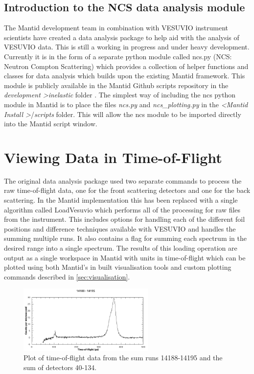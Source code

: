 \documentclass[paper=a4, fontsize=11pt]{scrartcl}	%
\numberwithin{equation}{section}															%
\numberwithin{figure}{section}																%
\numberwithin{table}{section}
\begin{document}
\subsection{Introduction to the NCS data analysis module}
\label{subsec:intro-data-analysis}
The Mantid development team in combination with VESUVIO instrument scientists have created a data analysis package to help aid with the analysis of VESUVIO data. This is still a working in progress and under heavy development. Currently it is in the form of a separate python module called ncs.py (NCS: Neutron Compton Scattering) which provides a collection of helper functions and classes for data analysis which builds upon the existing Mantid framework. This module is publicly available in the Mantid Github scripts repository in the \textit{development \textgreater  inelastic} folder \cite{mantidgithubncs}. The simplest way of including the ncs python module in Mantid is to place the files \textit{ncs.py} and \textit{ncs\_plotting.py} in the \textit{ \textless Mantid Install \textgreater }/\textit{scripts} folder. This will allow the ncs module to be imported directly into the Mantid script window.

\section{Viewing Data in Time-of-Flight}
\label{sec:viewtof}
The original data analysis package \cite{mayers2010user} used two separate commands to process the raw time-of-flight data, one for the front scattering detectors and one for the back scattering. In the Mantid implementation this has been replaced with a single algorithm called LoadVesuvio which performs all of the processing for raw files from the instrument. This includes options for handling each of the different foil positions and difference techniques available with VESUVIO \citep{schooneveld2006foil, mayers2004vesuvio} and handles the summing multiple runs. It also contains a flag for summing each spectrum in the desired range into a single spectrum. The results of this loading operation are output as a single workspace in Mantid with units in time-of-flight which can be plotted using both Mantid's in built visualisation tools and custom plotting commands described in \ref{sec:visualisation}.

\begin{figure}[H]
\centering
\includegraphics[width=0.6\textwidth]{img/tof-spectrum.png}
\caption{Plot of time-of-flight data from the sum runs 14188-14195 and the sum of detectors 40-134.}
\label{fig:tof-spectrum}
\end{figure}
\end{document}

